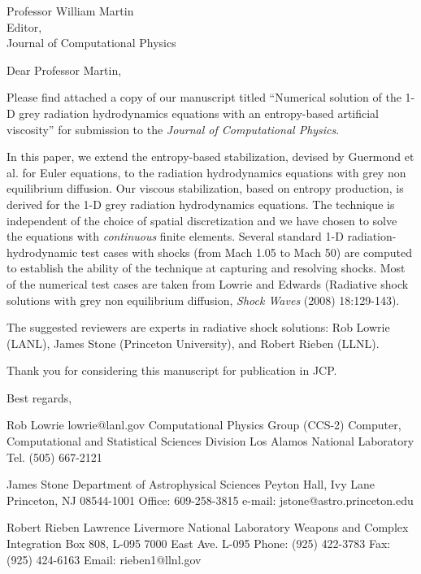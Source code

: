 \begin{letter}{Professor William Martin\\
    Editor,\\
    Journal of Computational Physics}
\date{\today}

\opening{Dear Professor Martin,}
         \vspace{0.25cm}

Please find attached a copy of our manuscript titled ``Numerical solution of the 1-D grey radiation hydrodynamics equations with an entropy-based artificial viscosity'' for submission to the {\em Journal of Computational Physics}. 

In this paper, we extend the entropy-based stabilization, devised by Guermond et al. for Euler equations, to the radiation hydrodynamics equations with grey non equilibrium diffusion. 
Our viscous stabilization, based on entropy production, is derived for the 1-D grey radiation hydrodynamics equations. The technique is independent of the choice of spatial discretization and we have chosen to solve the equations with {\em continuous} finite elements. 
Several standard 1-D radiation-hydrodynamic test cases with shocks (from Mach 1.05 to Mach 50) are computed to establish the ability of the technique at capturing and resolving shocks. Most of the numerical test cases are taken from Lowrie and Edwards (Radiative shock solutions with grey non equilibrium diffusion, {\it Shock Waves} (2008) 18:129-143).

 
The suggested reviewers are experts in radiative shock solutions: Rob Lowrie (LANL), James Stone (Princeton University), and Robert Rieben (LLNL).
 

Thank you for considering this manuscript for publication in JCP.




\closing{Best regards, }

\end{letter}


Rob Lowrie
lowrie@lanl.gov
Computational Physics Group (CCS-2)
Computer, Computational and Statistical Sciences Division Los Alamos National Laboratory 
Tel. (505) 667-2121

James Stone
Department of Astrophysical Sciences
Peyton Hall, Ivy Lane
Princeton, NJ 08544-1001
Office: 609-258-3815
e-mail: jstone@astro.princeton.edu 

Robert Rieben
Lawrence Livermore National Laboratory
Weapons and Complex Integration
Box 808, L-095 
7000 East Ave. L-095
Phone: (925) 422-3783
Fax: (925) 424-6163
Email: rieben1@llnl.gov
